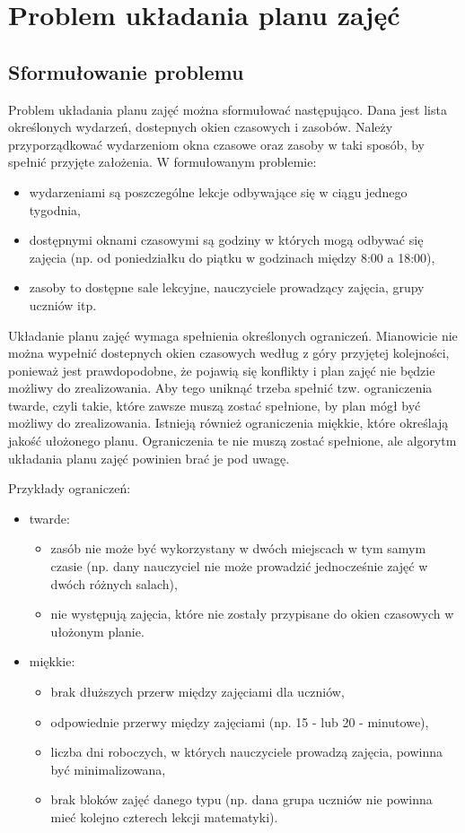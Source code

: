 \chapter{Problem układania planu zajęć}
\section{Sformułowanie problemu}
Problem układania planu zajęć można sformułować następująco. Dana jest lista określonych wydarzeń, dostepnych okien czasowych i zasobów. Należy przyporządkować wydarzeniom okna czasowe oraz zasoby w taki sposób, by spełnić przyjęte założenia. W formułowanym problemie:
\begin{itemize}
	\item wydarzeniami są poszczególne lekcje odbywające się w ciągu jednego tygodnia,
	\item dostępnymi oknami czasowymi są godziny w których mogą odbywać się zajęcia (np. od poniedziałku do piątku w godzinach między 8:00 a 18:00),
	\item zasoby to dostępne sale lekcyjne, nauczyciele prowadzący zajęcia, grupy uczniów itp.
\end{itemize}

Układanie planu zajęć wymaga spełnienia określonych ograniczeń. Mianowicie nie można wypełnić dostepnych okien czasowych według z góry przyjętej kolejności, ponieważ jest prawdopodobne, że pojawią się konflikty i plan zajęć nie będzie możliwy do zrealizowania. Aby tego uniknąć trzeba spełnić tzw. ograniczenia twarde, czyli takie, które zawsze muszą zostać spełnione, by plan mógł być możliwy do zrealizowania. Istnieją również ograniczenia miękkie, które określają jakość ułożonego planu. Ograniczenia te nie muszą zostać spełnione, ale algorytm układania planu zajęć powinien brać je pod uwagę.

\newpage
Przykłady ograniczeń:
\begin{itemize}
	\item twarde:
	\begin{itemize}
		\item zasób nie może być wykorzystany w dwóch miejscach w tym samym czasie (np. dany nauczyciel nie może prowadzić jednocześnie zajęć w dwóch różnych salach),
		\item nie występują zajęcia, które nie zostały przypisane do okien czasowych w ułożonym planie.
	\end{itemize}
	\item miękkie:
	\begin{itemize}
		\item brak dłuższych przerw między zajęciami dla uczniów,
		\item odpowiednie przerwy między zajęciami (np. 15 - lub 20 - minutowe),
		\item liczba dni roboczych, w których nauczyciele prowadzą zajęcia, powinna być minimalizowana,
		\item brak bloków zajęć danego typu (np. dana grupa uczniów nie powinna mieć kolejno czterech lekcji matematyki).
	\end{itemize}
\end{itemize}

